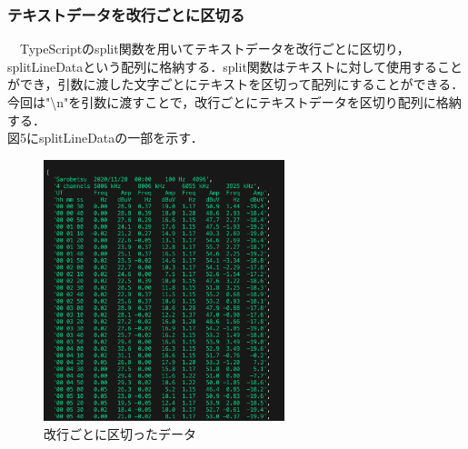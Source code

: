  \subsubsection{テキストデータを改行ごとに区切る}
　TypeScriptのsplit関数を用いてテキストデータを改行ごとに区切り，splitLineDataという配列に格納する．split関数はテキストに対して使用することができ，引数に渡した文字ごとにテキストを区切って配列にすることができる．今回は"\textbackslash n"を引数に渡すことで，改行ごとにテキストデータを区切り配列に格納する．\\
 図5にsplitLineDataの一部を示す．\\
 \begin{figure}[h]
   \centering
   \label{fig:my_label}
   \includegraphics[width=70mm]{fig/splitLineData.png}
    \caption{改行ごとに区切ったデータ}
 \end{figure}
 
